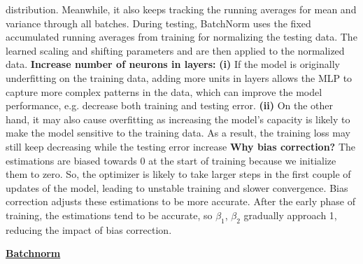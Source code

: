 \documentclass{article}
\renewcommand{\bf}[1]{\textbf{{#1}}}
\newcommand{\ul}[1]{\underline{{#1}}}
\newcommand{\eps}{\varepsilon}
\begin{document}
\begin{small}
distribution. Meanwhile, it also keeps tracking the running averages for mean and variance through
all batches. During testing, BatchNorm uses the fixed accumulated running averages from training for
normalizing the testing data. The learned scaling and shifting parameters  and  are then applied to
the normalized data.
\newline
\bf{Increase number of neurons in layers:}
\bf{(i)} If the model is originally underfitting on the training data, adding more units in layers
allows the MLP to capture more complex patterns in the data, which can improve the model
performance, e.g. decrease both training and testing error. \bf{(ii)} On the other hand, it may also
cause overfitting as increasing the model’s capacity is likely to make the model sensitive to the
training data. As a result, the training loss may still keep decreasing while the testing error
increase
\newline
\bf{Why bias correction?}
The estimations are biased towards 0 at the start of training because we initialize them to zero.
So, the optimizer is likely to take larger steps in the first couple of updates of the model,
leading to unstable training and slower convergence. Bias correction adjusts these estimations to be
more accurate. After the early phase of training, the estimations tend to be accurate, so $\beta_1$,
$\beta_2$ gradually approach 1, reducing the impact of bias correction.

\newpage
\ul{\bf{Batchnorm}}
\vspace{-1em}
\begin{center}
\end{center}
\end{small}
\end{document}

